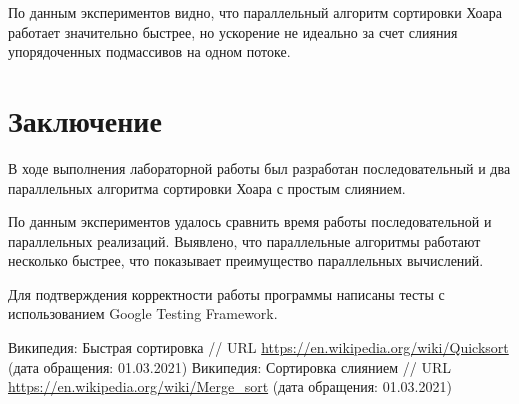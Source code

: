 \documentclass{report}
\begin{document}
\par По данным экспериментов видно, что параллельный алгоритм сортировки Хоара работает значительно быстрее, но ускорение не идеально за счет слияния упорядоченных подмассивов на одном потоке.
\newpage

\section*{Заключение}
В ходе выполнения лабораторной работы был разработан последовательный и два параллельных алгоритма сортировки Хоара с простым слиянием.
\par По данным экспериментов удалось сравнить время работы последовательной и параллельных реализаций. Выявлено, что параллельные алгоритмы работают несколько быстрее, что показывает преимущество параллельных вычислений.
\par Для подтверждения корректности работы программы написаны тесты с использованием Google Testing Framework.
\newpage

\begin{thebibliography}{1}
 Википедия: Быстрая сортировка // URL \url {https://en.wikipedia.org/wiki/Quicksort} (дата обращения: 01.03.2021)
 Википедия: Сортировка слиянием // URL \url {https://en.wikipedia.org/wiki/Merge_sort} (дата обращения: 01.03.2021)
\end{thebibliography}
\newpage

\end{document}
